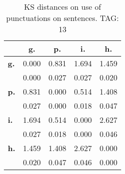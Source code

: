 \begin{table}[h!]
\begin{center}
\begin{tabular}{| l || c | c | c | c |}\hline
 & {\bf g.} & {\bf p.} & {\bf i.} & {\bf h.} \\\hline\hline
{\bf g.} & 0.000 & 0.831 & 1.694 & 1.459 \\
{\bf } & 0.000 & 0.027 & 0.027 & 0.020 \\\hline
{\bf p.} & 0.831 & 0.000 & 0.514 & 1.408 \\
{\bf } & 0.027 & 0.000 & 0.018 & 0.047 \\\hline
{\bf i.} & 1.694 & 0.514 & 0.000 & 2.627 \\
{\bf } & 0.027 & 0.018 & 0.000 & 0.046 \\\hline
{\bf h.} & 1.459 & 1.408 & 2.627 & 0.000 \\
{\bf } & 0.020 & 0.047 & 0.046 & 0.000 \\\hline
\end{tabular}
\caption{KS distances on use of punctuations on sentences. TAG: 13}
\end{center}
\end{table}